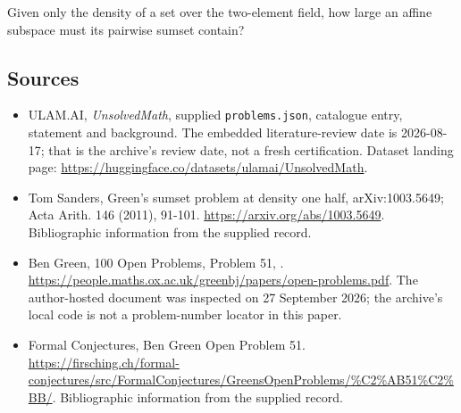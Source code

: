 \documentclass[11pt,a4paper]{article}
\begin{document}
Given only the density of a set over the two-element field, how large an affine subspace must its pairwise sumset contain?

\subsection{Sources}

{\small

\begin{itemize}

\item[\hypertarget{source:statement:1}{S1}] ULAM.AI, \emph{UnsolvedMath}, supplied \texttt{problems.json}, catalogue entry, statement and background. The embedded literature-review date is 2026-08-17; that is the archive’s review date, not a fresh certification. Dataset landing page: \url{https://huggingface.co/datasets/ulamai/UnsolvedMath}.

\item[\hypertarget{source:statement:2}{S2}] Tom Sanders, Green's sumset problem at density one half, arXiv:1003.5649; Acta Arith. 146 (2011), 91-101. \url{https://arxiv.org/abs/1003.5649}. Bibliographic information from the supplied record.

\item[\hypertarget{source:statement:3}{S3}] Ben Green, 100 Open Problems, Problem 51, . \url{https://people.maths.ox.ac.uk/greenbj/papers/open-problems.pdf}. The author-hosted document was inspected on 27 September 2026; the archive’s local code is not a problem-number locator in this paper.

\item[\hypertarget{source:statement:4}{S4}] Formal Conjectures, Ben Green Open Problem 51. \url{https://firsching.ch/formal-conjectures/src/FormalConjectures/GreensOpenProblems/%C2%AB51%C2%BB/}. Bibliographic information from the supplied record.

\end{itemize}

}

\label{end:statement}
\end{document}
